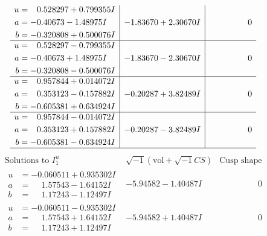 \documentclass[1p]{elsarticle_modified}
\theoremstyle{definition}
\newcommand{\I}{\sqrt{-1}}
\begin{document}
$$\begin{array}{c|c|c}
\begin{aligned}
u &= \phantom{-}0.528297 + 0.799355 I \\
a &= -0.40673 - 1.48975 I \\
b &= -0.320808 + 0.500076 I\end{aligned}
 & -1.83670 + 2.30670 I & \phantom{-0.000000 } 0 \\ \hline\begin{aligned}
u &= \phantom{-}0.528297 - 0.799355 I \\
a &= -0.40673 + 1.48975 I \\
b &= -0.320808 - 0.500076 I\end{aligned}
 & -1.83670 - 2.30670 I & \phantom{-0.000000 } 0 \\ \hline\begin{aligned}
u &= \phantom{-}0.957844 + 0.014072 I \\
a &= \phantom{-}0.353123 - 0.157882 I \\
b &= -0.605381 + 0.634924 I\end{aligned}
 & -0.20287 + 3.82489 I & \phantom{-0.000000 } 0 \\ \hline\begin{aligned}
u &= \phantom{-}0.957844 - 0.014072 I \\
a &= \phantom{-}0.353123 + 0.157882 I \\
b &= -0.605381 - 0.634924 I\end{aligned}
 & -0.20287 - 3.82489 I & \phantom{-0.000000 } 0\\
 \hline 
 \end{array}$$\newpage$$\begin{array}{c|c|c}  
\text{Solutions to }I^u_{1}& \I (\text{vol} + \sqrt{-1}CS) & \text{Cusp shape}\\
 \hline 
\begin{aligned}
u &= -0.060511 + 0.935302 I \\
a &= \phantom{-}1.57543 - 1.64152 I \\
b &= \phantom{-}1.17243 - 1.12497 I\end{aligned}
 & -5.94582 - 1.40487 I & \phantom{-0.000000 } 0 \\ \hline\begin{aligned}
u &= -0.060511 - 0.935302 I \\
a &= \phantom{-}1.57543 + 1.64152 I \\
b &= \phantom{-}1.17243 + 1.12497 I\end{aligned}
 & -5.94582 + 1.40487 I & \phantom{-0.000000 } 0 \\ \hline\begin{aligned}

\end{aligned}
\end{array}$$
\end{document}
